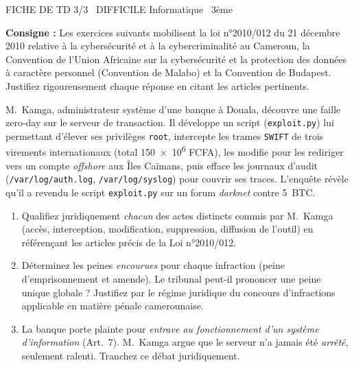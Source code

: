 \documentclass[11pt]{article}
\begin{document}
\begin{tcolorbox}[enhanced,colback=popink,colframe=popink,arc=10pt,boxrule=0pt,left=12pt,right=12pt,top=9pt,bottom=9pt]
{\color{white}\popxbold\small FICHE DE TD 3/3 \textbullet\ DIFFICILE \hfill Informatique \textbullet\ 3ème\par}
\end{tcolorbox}
\vspace{4pt}
\noindent\textbf{Consigne :} Les exercices suivants mobilisent la loi n°2010/012 du 21 décembre 2010 relative à la cybersécurité et à la cybercriminalité au Cameroun, la Convention de l'Union Africaine sur la cybersécurité et la protection des données à caractère personnel (Convention de Malabo) et la Convention de Budapest. Justifiez rigoureusement chaque réponse en citant les articles pertinents.

\begin{exercice}
M.~Kamga, administrateur système d'une banque à Douala, découvre une faille zero-day sur le serveur de transaction. Il développe un script (\texttt{exploit.py}) lui permettant d'élever ses privilèges \texttt{root}, intercepte les trames \texttt{SWIFT} de trois virements internationaux (total \num{150e6} FCFA), les modifie pour les rediriger vers un compte \textit{offshore} aux Îles Caïmans, puis efface les journaux d'audit (\texttt{/var/log/auth.log}, \texttt{/var/log/syslog}) pour couvrir ses traces. L'enquête révèle qu'il a revendu le script \texttt{exploit.py} sur un forum \textit{darknet} contre 5~BTC.
\begin{enumerate}
    \item Qualifiez juridiquement \textit{chacun} des actes distincts commis par M.~Kamga (accès, interception, modification, suppression, diffusion de l'outil) en référençant les articles précis de la Loi n°2010/012.
    \item Déterminez les peines \textit{encourues} pour chaque infraction (peine d'emprisonnement et amende). Le tribunal peut-il prononcer une peine unique globale ? Justifiez par le régime juridique du concours d'infractions applicable en matière pénale camerounaise.
    \item La banque porte plainte pour \textit{entrave au fonctionnement d'un système d'information} (Art.~7). M.~Kamga argue que le serveur n'a jamais été \textit{arrêté}, seulement ralenti. Tranchez ce débat juridiquement.
\end{enumerate}
\end{exercice}
\end{document}
